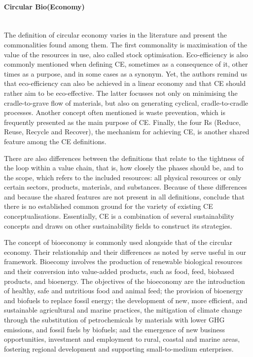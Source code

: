 \paragraph{Circular Bio(Economy)} \mbox{}\\
 The definition of circular economy varies in the literature and \cite{kalmykova2018circular} present the commonalities found among them. The first commonality is maximisation of the value of the resources in use, also called stock optimisation. Eco-efficiency is also commonly mentioned when defining CE, sometimes as a consequence of it, other times as a purpose, and in some cases as a synonym. Yet, the authors remind us that eco-efficiency can also be achieved in a linear economy and that CE should rather aim to be eco-effective. The latter focusses not only on minimising the cradle-to-grave flow of materials, but also on generating cyclical, cradle-to-cradle processes. Another concept often mentioned is waste prevention, which is frequently presented as the main purpose of CE. Finally, the four Rs (Reduce, Reuse, Recycle and Recover), the mechanism for achieving CE, is another shared feature among the CE definitions. 

There are also differences between the definitions that relate to the tightness of the loop within a value chain, that is, how closely the phases should be, and to the scope, which refers to the included resources: all physical resources or only certain sectors, products, materials, and substances. Because of these differences and because the shared features are not present in all definitions, \citeauthor{kalmykova2018circular} conclude that there is no established common ground for the variety of existing CE conceptualisations. Essentially, CE is a combination of several sustainability concepts and draws on other sustainability fields to construct its strategies. 

The concept of bioeconomy is commonly used alongside that of the circular economy. Their relationship and their differences as noted by \cite{carus2018circular} serve useful in our framework. Bioecomy involves the production of renewable biological resources and their conversion into value-added products, such as food, feed, biobased products, and bioenergy. The objectives of the bioeconomy are the introduction of healthy, safe and nutritious food and animal feed; the provision of bioenergy and biofuels to replace fossil energy; the development of new, more efficient, and sustainable agricultural and marine practices, the mitigation of climate change through the substitution of petrochemicals by materials with lower GHG emissions, and fossil fuels by biofuels; and the emergence of new business opportunities, investment and employment to rural, coastal and marine areas, fostering regional development and supporting small-to-medium enterprises.

